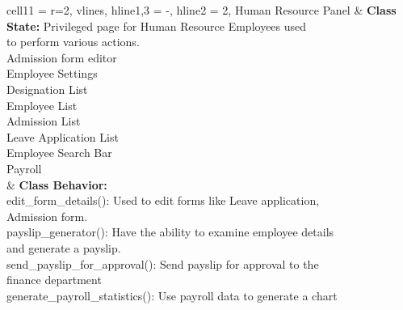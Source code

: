 \documentclass[11pt]{article}
\begin{document}
\begin{longtblr}[
  label = none,
  entry = none,
]{
  cell{1}{1} = {r=2}{},
  vlines,
  hline{1,3} = {-}{},
  hline{2} = {2}{},
}
Human Resource Panel & {\textbf{Class State:} Privileged page for Human Resource Employees used\\ to perform various actions.\\
\hspace{\dimexpr\labelsep+0.5\tabcolsep}Admission form editor\\
\hspace{\dimexpr\labelsep+0.5\tabcolsep}Employee Settings\\
\hspace{\dimexpr\labelsep+0.5\tabcolsep}Designation List\\
\hspace{\dimexpr\labelsep+0.5\tabcolsep}Employee List\\
\hspace{\dimexpr\labelsep+0.5\tabcolsep}Admission List\\
\hspace{\dimexpr\labelsep+0.5\tabcolsep}Leave Application List\\
\hspace{\dimexpr\labelsep+0.5\tabcolsep}Employee Search Bar\\
\hspace{\dimexpr\labelsep+0.5\tabcolsep}Payroll}\\
                     & {\textbf{Class Behavior:}\\
\hspace{\dimexpr\labelsep+0.5\tabcolsep}edit\_form\_details(): Used to edit forms like Leave application,
\\ Admission form.\\
\hspace{\dimexpr\labelsep+0.5\tabcolsep}payslip\_generator(): Have the ability to examine employee details\\
 and generate a payslip.\\
\hspace{\dimexpr\labelsep+0.5\tabcolsep}send\_payslip\_for\_approval(): Send payslip for approval to the
\\finance department\\
\hspace{\dimexpr\labelsep+0.5\tabcolsep}generate\_payroll\_statistics(): Use payroll data to generate a chart\\
}
\end{longtblr}
\end{document}
